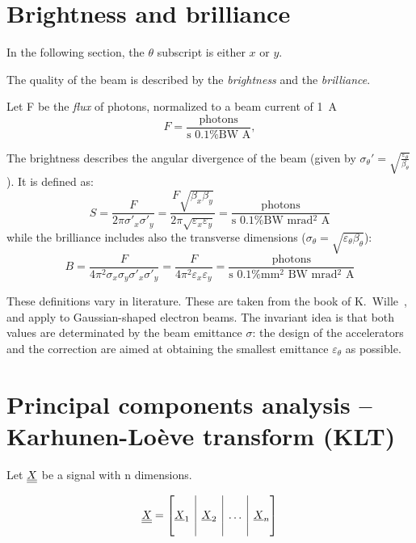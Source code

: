 
\section{Brightness and brilliance}
\label{apx:brightness_brilliance}
In the following section, the $\theta$ subscript is either $x$ or $y$.

The quality of the beam is described by the \emph{brightness} and the \emph{brilliance}.

Let F be the \emph{flux} of photons, normalized to a beam current of 1~A
\begin{equation}
F = \frac{\text{photons}}{\text{s 0.1\% BW A}},
\end{equation}

The brightness describes the angular divergence of the beam (given by $\sigma_\theta'=\sqrt{\frac{\varepsilon_\theta}{\beta_\theta}}$). It is defined as:
\begin{equation}
S = \frac{F}{2 \pi \sigma'_x \sigma'_y} = \frac{F \sqrt{\beta_x \beta_y}}{2 \pi \sqrt{\varepsilon_x \varepsilon_y}} = \frac{\text{photons}}{\text{s 0.1\% BW mrad$^2$ A}}
\end{equation}
while the brilliance includes also the transverse dimensions ($\sigma_\theta=\sqrt{\varepsilon_\theta \beta_\theta}$):
\begin{equation}
B = \frac{F}{4 \pi^2 \sigma_x \sigma_y \sigma'_x \sigma'_y} = \frac{F}{4 \pi^2 \varepsilon_x \varepsilon_y} = \frac{\text{photons}}{\text{s 0.1\% mm$^2$ BW mrad$^2$ A}}
\end{equation}

These definitions vary in literature. These are taken from the book of K.~Wille~\cite{book:wille}, and apply to Gaussian-shaped electron beams. The invariant idea is that both values are determinated by the beam emittance $\sigma$: the design of the accelerators and the correction are aimed at obtaining the smallest emittance $\varepsilon_\theta$ as possible.

\section{Principal components analysis -- Karhunen-Loève transform (KLT)}
\label{apx:KLT}

Let $\underline{\underline{X}}$ be a signal with n dimensions.

\begin{equation}
\mat{X} = \left[
\begin{array}{@{}c|c|c|c@{}}
&&&\\ \vec{X}_1 & \vec{X}_2 & \dots & \vec{X}_n \\ &&&
\end{array}
\right]
\end{equation} 

